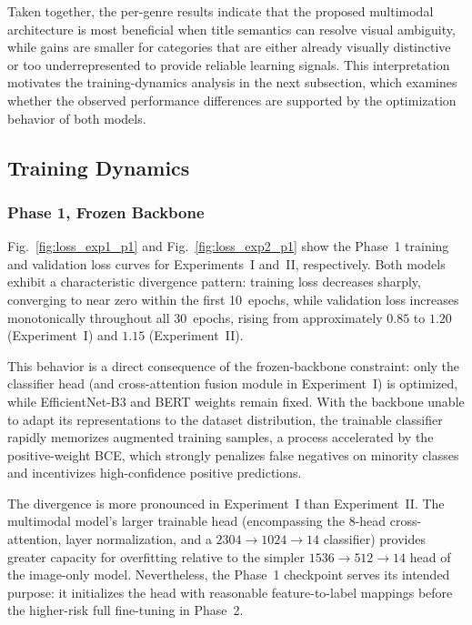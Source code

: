 \documentclass[conference]{IEEEtran}
\begin{document}
Taken together, the per-genre results indicate that the proposed
multimodal architecture is most beneficial when title semantics can
resolve visual ambiguity, while gains are smaller for categories that
are either already visually distinctive or too underrepresented to
provide reliable learning signals. This interpretation motivates the
training-dynamics analysis in the next subsection, which examines
whether the observed performance differences are supported by the
optimization behavior of both models.

\FloatBarrier
\subsection{Training Dynamics}
\label{sec:training_dynamics}

\subsubsection{Phase 1, Frozen Backbone}

Fig.~\ref{fig:loss_exp1_p1} and Fig.~\ref{fig:loss_exp2_p1} show
the Phase~1 training and validation loss curves for Experiments~I
and~II, respectively. Both models exhibit a characteristic divergence
pattern: training loss decreases sharply, converging to near zero
within the first 10~epochs, while validation loss increases
monotonically throughout all 30~epochs, rising from approximately
$0.85$ to $1.20$ (Experiment~I) and $1.15$ (Experiment~II).

This behavior is a direct consequence of the frozen-backbone
constraint: only the classifier head (and cross-attention fusion
module in Experiment~I) is optimized, while EfficientNet-B3
and BERT weights remain fixed. With the backbone unable to adapt
its representations to the dataset distribution, the trainable
classifier rapidly memorizes augmented training samples, a process
accelerated by the positive-weight BCE, which strongly penalizes
false negatives on minority classes and incentivizes high-confidence
positive predictions.

The divergence is more pronounced in Experiment~I than
Experiment~II. The multimodal model's larger trainable head
(encompassing the 8-head cross-attention, layer normalization, and
a $2304 \rightarrow 1024 \rightarrow 14$ classifier) provides
greater capacity for overfitting relative to the simpler
$1536 \rightarrow 512 \rightarrow 14$ head of the image-only model.
Nevertheless, the Phase~1 checkpoint serves its intended purpose:
it initializes the head with reasonable feature-to-label mappings
before the higher-risk full fine-tuning in Phase~2.
\end{document}
